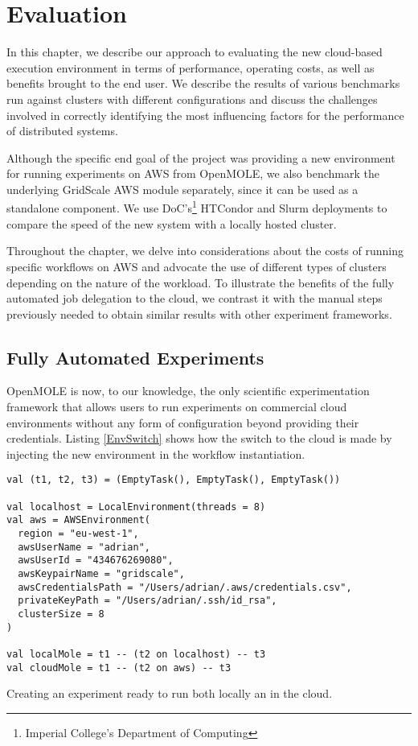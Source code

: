 \chapter{Evaluation} \label{EvaluationChapter}

In this chapter, we describe our approach to evaluating the new cloud-based execution environment in terms of performance, operating costs, as well as benefits brought to the end user. We describe the results of various benchmarks run against clusters with different configurations and discuss the challenges involved in correctly identifying the most influencing factors for the performance of distributed systems.

Although the specific end goal of the project was providing a new environment for running experiments on AWS from OpenMOLE, we also benchmark the underlying GridScale AWS module separately, since it can be used as a standalone component. We use DoC's\footnote{Imperial College's Department of Computing} HTCondor and Slurm deployments to compare the speed of the new system with a locally hosted cluster.

Throughout the chapter, we delve into considerations about the costs of running specific workflows on AWS and advocate the use of different types of clusters depending on the nature of the workload. To illustrate the benefits of the fully automated job delegation to the cloud, we contrast it with the manual steps previously needed to obtain similar results with other experiment frameworks.

\section{Fully Automated Experiments}

OpenMOLE is now, to our knowledge, the only scientific experimentation framework that allows users to run experiments on commercial cloud environments without any form of configuration beyond providing their credentials. Listing \ref{EnvSwitch} shows how the switch to the cloud is made by injecting the new environment in the workflow instantiation.

\begin{listing}[h]
	\centering
	\begin{minipage}{11.6cm}
		\begin{verbatim}
val (t1, t2, t3) = (EmptyTask(), EmptyTask(), EmptyTask())
		
val localhost = LocalEnvironment(threads = 8)
val aws = AWSEnvironment(
  region = "eu-west-1",
  awsUserName = "adrian",
  awsUserId = "434676269080",
  awsKeypairName = "gridscale",
  awsCredentialsPath = "/Users/adrian/.aws/credentials.csv",
  privateKeyPath = "/Users/adrian/.ssh/id_rsa",
  clusterSize = 8
)

val localMole = t1 -- (t2 on localhost) -- t3
val cloudMole = t1 -- (t2 on aws) -- t3
		\end{verbatim}
	\end{minipage}
	\caption{Creating an experiment ready to run both locally an in the cloud.}
	\label{EnvSwitch}
\end{listing}

